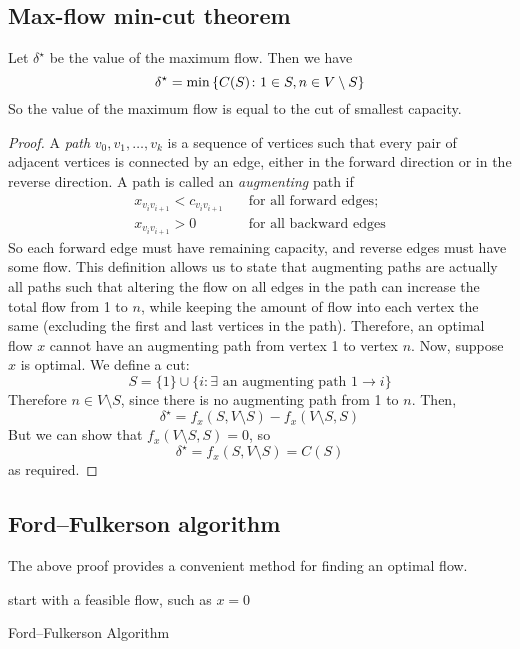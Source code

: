 \subsection{Max-flow min-cut theorem}
\begin{theorem}
	Let \( \delta^\star \) be the value of the maximum flow.
	Then we have
	\[
		\delta^\star = \min \qty{ C(S) \colon 1 \in S, n \in V \setminus S }
	\]
	So the value of the maximum flow is equal to the cut of smallest capacity.
\end{theorem}
\begin{proof}
	A \textit{path} \( v_0, v_1, \dots, v_k \) is a sequence of vertices such that every pair of adjacent vertices is connected by an edge, either in the forward direction or in the reverse direction.
	A path is called an \textit{augmenting} path if
	\begin{align*}
		x_{v_i v_{i+1}} < c_{v_i v_{i+1}} & \quad \text{for all forward edges}; \\
		x_{v_i v_{i+1}} > 0               & \quad \text{for all backward edges}
	\end{align*}
	So each forward edge must have remaining capacity, and reverse edges must have some flow.
	This definition allows us to state that augmenting paths are actually all paths such that altering the flow on all edges in the path can increase the total flow from 1 to \( n \), while keeping the amount of flow into each vertex the same (excluding the first and last vertices in the path).
	Therefore, an optimal flow \( x \) cannot have an augmenting path from vertex 1 to vertex \( n \).
	Now, suppose \( x \) is optimal.
	We define a cut:
	\[
		S = \{ 1 \} \cup \{ i \colon \exists \text{ an augmenting path } 1 \to i \}
	\]
	Therefore \( n \in V \setminus S \), since there is no augmenting path from 1 to \( n \).
	Then,
	\[
		\delta^\star = f_x(S, V \setminus S) - f_x(V \setminus S, S)
	\]
	But we can show that \( f_x(V \setminus S, S) = 0 \), so
	\[
		\delta^\star = f_x(S, V \setminus S) = C(S)
	\]
	as required.
\end{proof}

\subsection{Ford--Fulkerson algorithm}
The above proof provides a convenient method for finding an optimal flow.

\begin{algorithm*}[H]
	\SetAlgoLined{}
	start with a feasible flow, such as \(x = 0\)\;
	\caption{Ford--Fulkerson Algorithm}
\end{algorithm*}

